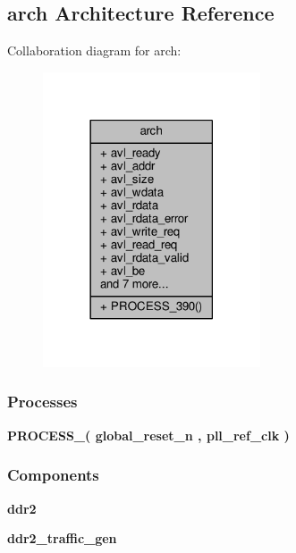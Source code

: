 \subsection{arch Architecture Reference}
\label{classddr2__tester_1_1arch}


Collaboration diagram for arch\+:\nopagebreak
\begin{figure}[H]
\begin{center}
\leavevmode
\includegraphics[width=182pt]{da/ddc/classddr2__tester_1_1arch__coll__graph}
\end{center}
\end{figure}
\subsubsection*{Processes}
 \begin{DoxyCompactItemize}
\item 
{\bf P\+R\+O\+C\+E\+S\+S\+\_}{\bfseries  ( {\bfseries {\bfseries {\bf global\+\_\+reset\+\_\+n}} \textcolor{vhdlchar}{ }} , {\bfseries {\bfseries {\bf pll\+\_\+ref\+\_\+clk}} \textcolor{vhdlchar}{ }} )}
\end{DoxyCompactItemize}
\subsubsection*{Components}
 \begin{DoxyCompactItemize}
\item 
{\bf ddr2}  {\bfseries }  
\item 
{\bf ddr2\+\_\+traffic\+\_\+gen}  {\bfseries }  
\end{DoxyCompactItemize}
